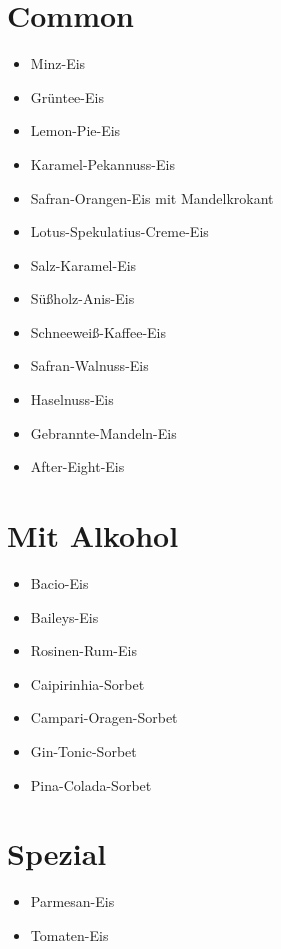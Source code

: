 \documentclass[12pt]{article}
\begin{document}
\section {Common}
\begin{itemize}
  \item Minz-Eis
  \item Grüntee-Eis
  \item Lemon-Pie-Eis
  \item Karamel-Pekannuss-Eis
  \item Safran-Orangen-Eis mit Mandelkrokant
  \item Lotus-Spekulatius-Creme-Eis
  \item Salz-Karamel-Eis
  \item Süßholz-Anis-Eis
  \item Schneeweiß-Kaffee-Eis
  \item Safran-Walnuss-Eis
  \item Haselnuss-Eis
  \item Gebrannte-Mandeln-Eis
  \item After-Eight-Eis
\end{itemize}

\section {Mit Alkohol}

\begin{itemize} 
  \item Bacio-Eis
  \item Baileys-Eis
  \item Rosinen-Rum-Eis
  \item Caipirinhia-Sorbet
  \item Campari-Oragen-Sorbet
  \item Gin-Tonic-Sorbet
  \item Pina-Colada-Sorbet
\end{itemize}

\section {Spezial}
\begin{itemize}
  \item Parmesan-Eis
  \item Tomaten-Eis
\end{itemize}
\end{document}
